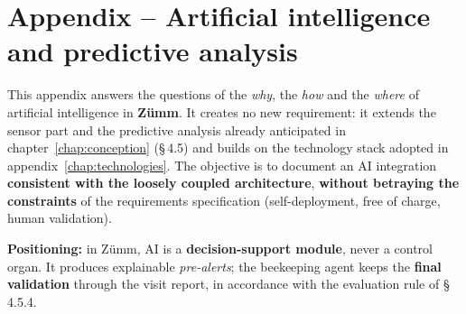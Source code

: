 
\chapter{Appendix -- Artificial intelligence and predictive analysis}
\label{chap:ia}
This appendix answers the questions of the \emph{why}, the \emph{how} and the
\emph{where} of artificial intelligence in \textbf{Zümm}. It creates no new
requirement: it extends the sensor part and the predictive analysis already
anticipated in chapter~\ref{chap:conception} (§\,4.5) and builds on the
technology stack adopted in appendix~\ref{chap:technologies}. The
objective is to document an AI integration \textbf{consistent with the loosely
coupled architecture}, \textbf{without betraying the constraints} of the
requirements specification (self-deployment, free of charge, human validation).

\begin{encadre}
\textbf{Positioning:} in Zümm, AI is a \textbf{decision-support module}, never a
control organ. It produces explainable \emph{pre-alerts}; the beekeeping agent
keeps the \textbf{final validation} through the visit report, in accordance with
the evaluation rule of §\,4.5.4.
\end{encadre}

